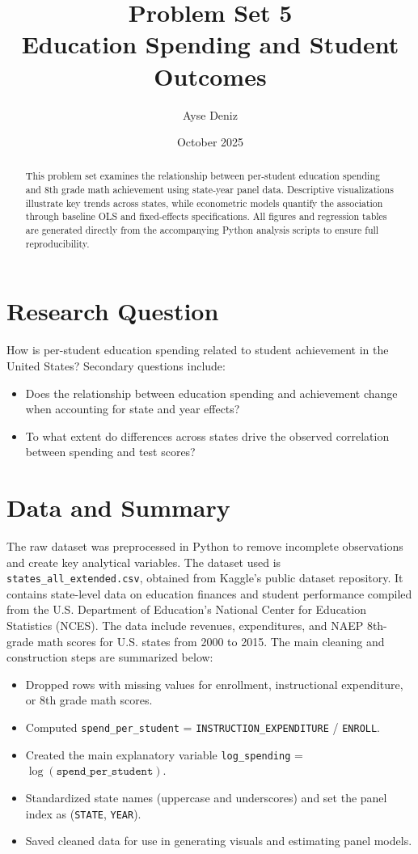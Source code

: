 \documentclass[12pt]{article}
\title{Problem Set 5 \\ \large{Education Spending and Student Outcomes}}
\author{Ayse Deniz}
\date{October 2025}
\begin{document}
\maketitle

\begin{abstract}
This problem set examines the relationship between per-student education spending and 8th grade math achievement using state-year panel data. 
Descriptive visualizations illustrate key trends across states, while econometric models quantify the association through baseline OLS and fixed-effects specifications. 
All figures and regression tables are generated directly from the accompanying Python analysis scripts to ensure full reproducibility.
\end{abstract}

\section*{Research Question}
How is per-student education spending related to student achievement in the United States?  
Secondary questions include:  
\begin{itemize}
  \item Does the relationship between education spending and achievement change when accounting for state and year effects?  
  \item To what extent do differences across states drive the observed correlation between spending and test scores?  
\end{itemize}

\section{Data and Summary}
The raw dataset was preprocessed in Python to remove incomplete observations and create key analytical variables. 
The dataset used is \texttt{states\_all\_extended.csv}, obtained from Kaggle’s public dataset repository. 
It contains state-level data on education finances and student performance compiled from the U.S. Department of Education’s National Center for Education Statistics (NCES). 
The data include revenues, expenditures, and NAEP 8th-grade math scores for U.S. states from 2000 to 2015. 
The main cleaning and construction steps are summarized below:

\begin{itemize}
  \item Dropped rows with missing values for enrollment, instructional expenditure, or 8th grade math scores.
  \item Computed \texttt{spend\_per\_student} = \texttt{INSTRUCTION\_EXPENDITURE} / \texttt{ENROLL}.
  \item Created the main explanatory variable \texttt{log\_spending} = $\log(\texttt{spend\_per\_student})$.
  \item Standardized state names (uppercase and underscores) and set the panel index as (\texttt{STATE}, \texttt{YEAR}).
  \item Saved cleaned data for use in generating visuals and estimating panel models.
\end{itemize}
\end{document}
